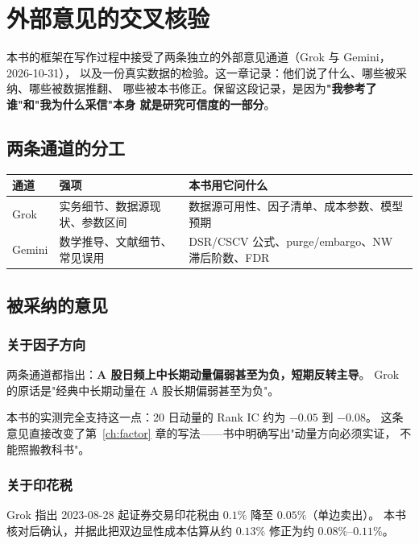 \chapter{外部意见的交叉核验}\label{app:crosscheck}

本书的框架在写作过程中接受了两条独立的外部意见通道（Grok 与 Gemini，2026-10-31），
以及一份真实数据的检验。这一章记录：他们说了什么、哪些被采纳、哪些被数据推翻、
哪些被本书修正。保留这段记录，是因为\textbf{"我参考了谁"和"我为什么采信"本身
就是研究可信度的一部分}。

\section{两条通道的分工}

\begin{center}
\begin{tabular}{@{}p{}p{}p{}@{}}
\toprule
通道 & 强项 & 本书用它问什么 \\
\midrule
Grok & 实务细节、数据源现状、参数区间 & 数据源可用性、因子清单、成本参数、模型预期 \\
Gemini & 数学推导、文献细节、常见误用 & DSR/CSCV 公式、purge/embargo、NW 滞后阶数、FDR \\
\bottomrule
\end{tabular}
\end{center}

\section{被采纳的意见}

\subsection{关于因子方向}

两条通道都指出：\textbf{A 股日频上中长期动量偏弱甚至为负，短期反转主导}。
Grok 的原话是"经典中长期动量在 A 股长期偏弱甚至为负"。

本书的实测完全支持这一点：20 日动量的 Rank IC 约为 $-0.05$ 到 $-0.08$。
这条意见直接改变了第~\ref{ch:factor} 章的写法——书中明确写出"动量方向必须实证，
不能照搬教科书"。

\subsection{关于印花税}

Grok 指出 2023-08-28 起证券交易印花税由 $0.1\%$ 降至 $0.05\%$（单边卖出）。
本书核对后确认，并据此把双边显性成本估算从约 $0.13\%$ 修正为约 $0.08\%$--$0.11\%$。

